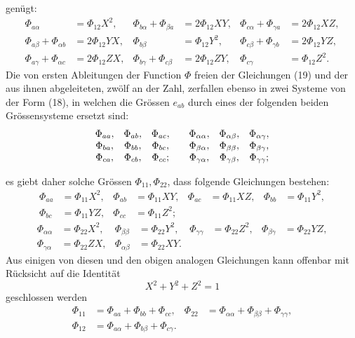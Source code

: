 \documentclass[11pt,a4paper,leqno]{article}
\begin{document}
genügt:
\[
\begin{aligned}
\Phi_{a\alpha}&=\Phi_{12}X^2,
&\Phi_{b\alpha}+\Phi_{\beta a}&=2\Phi_{12}XY,
&\Phi_{c\alpha}+\Phi_{\gamma a}&=2\Phi_{12}XZ,\\
\Phi_{a\beta}+\Phi_{\alpha b}&=2\Phi_{12}YX,
&\Phi_{b\beta}&=\Phi_{12}Y^2,
&\Phi_{c\beta}+\Phi_{\gamma b}&=2\Phi_{12}YZ,\\
\Phi_{a\gamma}+\Phi_{\alpha c}&=2\Phi_{12}ZX,
&\Phi_{b\gamma}+\Phi_{c\beta}&=2\Phi_{12}ZY,
&\Phi_{c\gamma}&=\Phi_{12}Z^2.
\end{aligned}
\]
Die von ersten Ableitungen der Function $\Phi$ freien der Gleichungen
(19) und der aus ihnen abgeleiteten, zwölf an der
Zahl, zerfallen ebenso in zwei Systeme von der Form (18), in
welchen die Grössen $e_{ab}$ durch eines der folgenden beiden
Grössensysteme ersetzt sind:
\[
\begin{array}{ccc@{\qquad}ccc}
\Phi_{aa},&\Phi_{ab},&\Phi_{ac},&
\Phi_{\alpha\alpha},&\Phi_{\alpha\beta},&\Phi_{\alpha\gamma},\\
\Phi_{ba},&\Phi_{bb},&\Phi_{bc},&
\Phi_{\beta\alpha},&\Phi_{\beta\beta},&\Phi_{\beta\gamma},\\
\Phi_{ca},&\Phi_{cb},&\Phi_{cc};&
\Phi_{\gamma\alpha},&\Phi_{\gamma\beta},&\Phi_{\gamma\gamma};
\end{array}
\]

es giebt daher solche Grössen $\Phi_{11},\Phi_{22}$, dass folgende Gleichungen
bestehen:
\[
\begin{aligned}
\Phi_{aa}&=\Phi_{11}X^2,&\Phi_{ab}&=\Phi_{11}XY,&
\Phi_{ac}&=\Phi_{11}XZ,&\Phi_{bb}&=\Phi_{11}Y^2,\\
\Phi_{bc}&=\Phi_{11}YZ,&\Phi_{cc}&=\Phi_{11}Z^2;
\end{aligned}
\]
\[
\begin{aligned}
\Phi_{\alpha\alpha}&=\Phi_{22}X^2,&\Phi_{\beta\beta}&=\Phi_{22}Y^2,&
\Phi_{\gamma\gamma}&=\Phi_{22}Z^2,&\Phi_{\beta\gamma}&=\Phi_{22}YZ,\\
\Phi_{\gamma\alpha}&=\Phi_{22}ZX,&\Phi_{\alpha\beta}&=\Phi_{22}XY.
\end{aligned}
\]
Aus einigen von diesen und den obigen analogen Gleichungen
kann offenbar mit Rücksicht auf die Identität
\[
X^2+Y^2+Z^2=1
\]
geschlossen werden
\begin{equation}\tag{20}
\begin{aligned}
\Phi_{11}&=\Phi_{aa}+\Phi_{bb}+\Phi_{cc},
&\Phi_{22}&=\Phi_{\alpha\alpha}+\Phi_{\beta\beta}+\Phi_{\gamma\gamma},\\
\Phi_{12}&=\Phi_{a\alpha}+\Phi_{b\beta}+\Phi_{c\gamma}.
\end{aligned}
\end{equation}
\end{document}
